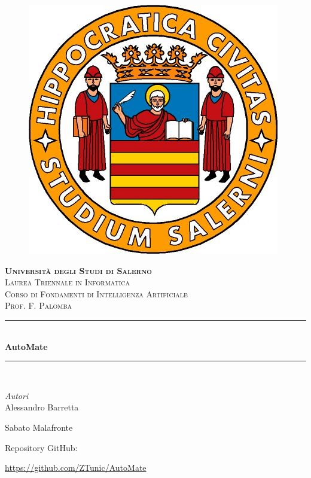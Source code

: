 \begin{titlepage}
	\newcommand{\HRule}{\rule{\linewidth}{0.5mm}}
	
	\center

        \begin{figure}
            \centering
            \includegraphics[scale=0.5]{Immagini/Logo.jpg}
        \end{figure}
 
	\textsc{\LARGE \textbf{Università degli Studi di Salerno}}\\[1.5cm]
	
	\textsc{\Large Laurea Triennale in Informatica}\\[0.5cm]
	
	\textsc{\large Corso di Fondamenti di Intelligenza Artificiale}\\[0.5cm]

        \textsc{\large Prof. F. Palomba}\\[0.5cm]

	\HRule\\[0.4cm]
	
	{\huge\bfseries AutoMate}\\[0.4cm]
	
	\HRule\\[1.5cm]
 
	\begin{minipage}{0.4\textwidth}
		\begin{flushleft}
			\large
			\centering\textit{Autori}\\
                \medskip
			Alessandro Barretta
                \medskip
                
                Sabato Malafronte
		\end{flushleft}
	\end{minipage}

        \bigskip
        \bigskip
        \bigskip
        Repository GitHub:
        
        \textcolor{blue}{\url{https://github.com/ZTunic/AutoMate}}
               
\end{titlepage}
